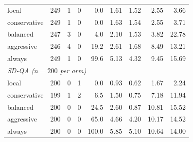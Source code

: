 \begin{table}[!ht]
\begin{tabular}{lrrrrrrrr}
local & 249 & 1 & 0 & 0.0 & 1.61 & 1.52 & 2.55 & 3.66 \\
conservative & 249 & 1 & 0 & 0.0 & 1.63 & 1.54 & 2.55 & 3.71 \\
balanced & 247 & 3 & 0 & 4.0 & 2.10 & 1.53 & 3.82 & 22.78 \\
aggressive & 246 & 4 & 0 & 19.2 & 2.61 & 1.68 & 8.49 & 13.21 \\
always & 249 & 1 & 0 & 99.6 & 5.13 & 4.32 & 9.45 & 15.69 \\
\midrule
\multicolumn{9}{l}{\textit{SD-QA ($n=200$ per arm)}} \\
local & 200 & 0 & 1 & 0.0 & 0.93 & 0.62 & 1.67 & 2.24 \\
conservative & 199 & 1 & 2 & 6.5 & 1.50 & 0.75 & 7.18 & 11.94 \\
balanced & 200 & 0 & 0 & 24.5 & 2.60 & 0.87 & 10.81 & 15.52 \\
aggressive & 200 & 0 & 0 & 65.0 & 4.66 & 4.20 & 10.17 & 14.52 \\
always & 200 & 0 & 0 & 100.0 & 5.85 & 5.10 & 10.64 & 14.00 \\
\bottomrule
\end{tabular}
\end{table}
